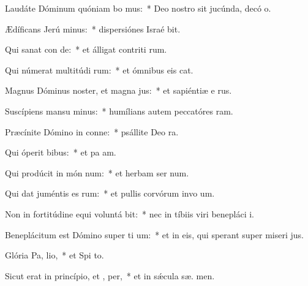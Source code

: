 \item Laudáte Dóminum quóniam bo  mus:~* Deo nostro sit jucúnda, decó o.
\item Ædíficans Jerú minus:~* dispersiónes Israé bit.
\item Qui sanat con de:~* et álligat contriti rum.
\item Qui númerat multitúdi rum:~* et ómnibus eis  cat.
\item Magnus Dóminus noster, et magna  jus:~* et sapiéntiæ e   rus.
\item Suscípiens mansu minus:~* humílians autem peccatóres   ram.
\item Præcínite Dómino in conne:~* psállite Deo   ra.
\item Qui óperit  bibus:~* et pa  am.
\item Qui prodúcit in món num:~* et herbam ser num.
\item Qui dat juméntis es rum:~* et pullis corvórum invo um.
\item Non in fortitúdine equi voluntá bit:~* nec in tíbiis viri benepláci  i.
\item Beneplácitum est Dómino super ti um:~* et in eis, qui sperant super miseri jus.
\item Glória Pa,  lio,~* et Spi to.
\item Sicut erat in princípio, et ,  per,~* et in sǽcula sæ. men.
